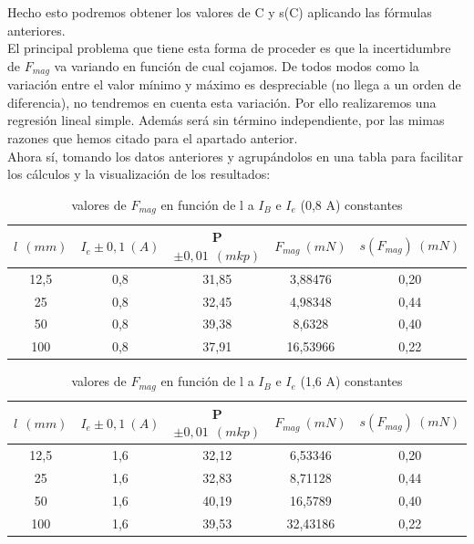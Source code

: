 \documentclass[12pt,a4paper]{book}
\begin{document}
Hecho esto podremos obtener los valores de C y s(C) aplicando las fórmulas anteriores.  \\

El principal problema que tiene esta forma de proceder es que la incertidumbre de $F_{mag}$ va variando en función de cual cojamos. De todos modos como la variación entre el valor mínimo y máximo es despreciable (no llega a un orden de diferencia), no tendremos en cuenta esta variación. Por ello realizaremos una regresión lineal simple. Además será sin término independiente, por las mimas razones que hemos citado para el apartado anterior. \\

Ahora sí, tomando los datos anteriores y agrupándolos en una tabla para facilitar los cálculos y la visualización de los resultados:


\vspace*{1.0cm} 

\begin{table}[h!]
\begin{center}
\begin{tabular}{|c|c|c|c|c|}
\hline
$ l \ \ (mm) $ & 	 $ I_e \pm 0,1 \ (A) $ & 	 P$\pm 0,01\ \ (mkp)$ & 	 $F_{mag} \ (mN)$ & 	 $s(F_{mag}) \ (mN)$ \\ \hline
12,5 & 	 0,8 & 	 31,85 & 	 3,88476 & 	 0,20 \\ 
25 & 	 0,8 & 	 32,45 & 	 4,98348 & 	 0,44 \\ 
50 & 	 0,8 & 	 39,38 & 	 8,6328 & 	 0,40 \\ 
100 & 	 0,8 & 	 37,91 & 	 16,53966 & 	 0,22 \\ 
\hline
\end{tabular}
\label{Tab: Fmag vs l a Ie=0,8A balanza}
\caption{valores de $F_{mag}$ en función de l a $I_B$ e $I_e$ (0,8 A) constantes}
\end{center}
\end{table} \newpage



\vspace*{2.5cm} 

\begin{table}[h!]
\begin{center}
\begin{tabular}{|c|c|c|c|c|}
\hline
$ l \ \ (mm) $ & 	 $ I_e \pm 0,1 \ (A) $ & 	 P$\pm 0,01\ \ (mkp)$ & 	 $F_{mag} \ (mN)$ & 	 $s(F_{mag}) \ (mN)$ \\ \hline
12,5 & 	 1,6 & 	 32,12 & 	 6,53346 & 	 0,20 \\ 
25 & 	 1,6 & 	 32,83 & 	 8,71128 & 	 0,44 \\ 
50 & 	 1,6 & 	 40,19 & 	 16,5789 & 	 0,40 \\ 
100 & 	 1,6 & 	 39,53 & 	 32,43186 & 	 0,22 \\ 
\hline
\end{tabular}
\label{Tab: Fmag vs l a Ie=1,6A balanza}
\caption{valores de $F_{mag}$ en función de l a $I_B$ e $I_e$ (1,6 A) constantes}
\end{center}
\end{table}
\end{document}
